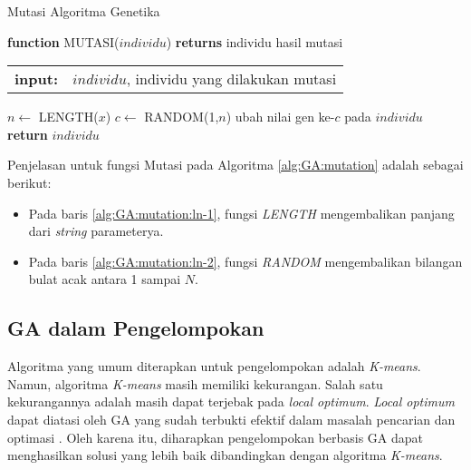 \begin{algorithm}[H]	
	\caption{Mutasi Algoritma Genetika}
	\label{alg:GA:mutation}
	\begin{flushleft}
		\textbf{function} MUTASI($individu$) \textbf{returns} individu hasil mutasi
		\begin{flushleft}
			\begin{tabular}{ l l }
				\textbf{input:}& $individu$, individu yang dilakukan mutasi
				\hspace{5pt} 
			\end{tabular} 
		\end{flushleft}
	\end{flushleft}
	
	\begin{algorithmic}[1]
		\STATE $n \leftarrow$ LENGTH($x$) \label{alg:GA:mutation:ln-1}
		\STATE $c \leftarrow$ RANDOM(1,$n$) \label{alg:GA:mutation:ln-2} 
		\STATE ubah nilai gen ke-$c$ pada $individu$  \label{alg:GA:mutation:ln-3}
		\STATE \textbf{return} {$individu$} \label{alg:GA:mutation:ln-4}
	\end{algorithmic}
\end{algorithm}

Penjelasan untuk fungsi Mutasi pada Algoritma \ref{alg:GA:mutation} adalah sebagai berikut:
\begin{itemize}
	\item Pada baris \ref{alg:GA:mutation:ln-1}, fungsi \textit{LENGTH} mengembalikan panjang dari \textit{string} parameterya.
	\item Pada baris \ref{alg:GA:mutation:ln-2}, fungsi \textit{RANDOM} mengembalikan bilangan bulat acak antara 1 sampai $N$.
\end{itemize}

\subsection{GA dalam Pengelompokan}
Algoritma yang umum diterapkan untuk pengelompokan adalah \textit{K-means}. Namun, algoritma \textit{K-means} masih memiliki kekurangan. Salah satu kekurangannya adalah masih dapat terjebak pada \textit{local optimum}. \textit{Local optimum} dapat diatasi oleh GA yang sudah terbukti efektif dalam masalah pencarian dan optimasi \cite{srinivas1994genetic}. Oleh karena itu, diharapkan pengelompokan berbasis GA dapat menghasilkan solusi yang lebih baik dibandingkan dengan algoritma \textit{K-means}.

